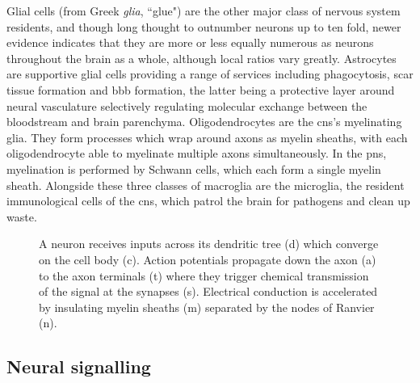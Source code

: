 Glial cells (from Greek \textit{glia}, ``glue") are the other major class of nervous system residents, and though long thought to outnumber neurons up to ten fold, newer evidence indicates that they are more or less equally numerous as neurons throughout the brain as a whole, although local ratios vary greatly.\autocite{Herculano-Houzel2014}
Astrocytes are supportive glial cells providing a range of services including phagocytosis, scar tissue formation and \gls{bbb} formation, the latter being a protective layer around neural vasculature selectively regulating molecular exchange between the bloodstream and brain parenchyma.
Oligodendrocytes are the \gls{cns}'s myelinating glia.
They form processes which wrap around axons as myelin sheaths, with each oligodendrocyte able to myelinate multiple axons simultaneously.
In the \gls{pns}, myelination is performed by Schwann cells, which each form a single myelin sheath.
Alongside these three classes of macroglia are the microglia, the resident immunological cells of the \gls{cns}, which patrol the brain for pathogens and clean up waste.

\begin{figure}[hbt!]
  \centering
  
  \caption{A neuron receives inputs across its dendritic tree (d) which converge on the cell body (c). Action potentials propagate down the axon (a) to the axon terminals (t) where they trigger chemical transmission of the signal at the synapses (s). Electrical conduction is accelerated by insulating myelin sheaths (m) separated by the nodes of Ranvier (n).}
  \label{fig:neuron}
\end{figure}

\subsection{Neural signalling}

